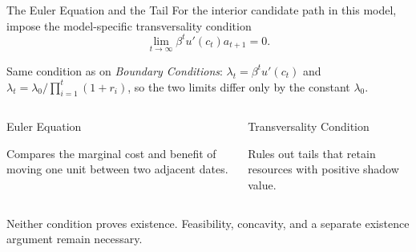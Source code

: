 \documentclass[11pt,aspectratio=169,c]{beamer}
\begin{document}
\begin{frame}{The Euler Equation and the Tail}
  For the interior candidate path in this model, impose the model-specific
  transversality condition
  \[
    \boxed{
      \lim_{t\to\infty}\beta^t u'(c_t)a_{t+1}=0.
    }
  \]

  Same condition as on \emph{Boundary Conditions}: $\lambda_t=\beta^tu'(c_t)$ and
  $\lambda_t=\lambda_0/\prod_{i=1}^{t}(1+r_i)$, so the two limits differ only by the
  constant $\lambda_0$.

  \begin{columns}[t,onlytextwidth]
    \begin{column}{\tightcolumnwidth}
      \begin{block}{Euler Equation}
        \begin{minipage}[t][1.65cm][t]{\dimexpr\linewidth-.76em\relax}
          Compares the marginal cost and benefit of moving one unit between two
          adjacent dates.
        \end{minipage}
      \end{block}
    \end{column}
    \hspace{\twocolumngutter}
    \begin{column}{\tightcolumnwidth}
      \begin{block}{Transversality Condition}
        \begin{minipage}[t][1.65cm][t]{\dimexpr\linewidth-.76em\relax}
          Rules out tails that retain resources with positive shadow value.
        \end{minipage}
      \end{block}
    \end{column}
  \end{columns}

  \vspace{.35em}
  Neither condition proves existence. Feasibility, concavity, and a separate
  existence argument remain necessary.
\end{frame}
\end{document}
